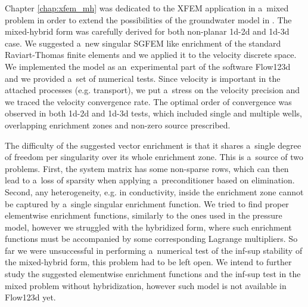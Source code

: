 \documentclass[bibliography=totocnumbered,dvipsnames,FM,Dis,EN]{tulthesis}
\begin{document}
Chapter \ref{chap:xfem_mh} was dedicated to the XFEM application in a~mixed problem
in order to extend the possibilities of the groundwater model in \cite{sistek_bddc_2015, flow123d}.
The mixed-hybrid form was carefully derived for both non-planar 1d-2d and 1d-3d case.
We suggested a~new singular SGFEM like enrichment of the standard Raviart-Thomas finite elements
and we applied it to the velocity discrete space.
We implemented the model as an~experimental part of the software Flow123d
and we provided a~set of numerical tests.
Since velocity is important in the attached processes (e.g. transport),
we put a~stress on the velocity precision and we traced the velocity convergence rate.
The optimal order of convergence was observed in both 1d-2d and 1d-3d tests,
which included single and multiple wells, overlapping enrichment zones and non-zero source prescribed.

The difficulty of the suggested vector enrichment is that it shares a~single degree of freedom per singularity
over its whole enrichment zone. This is a~source of two problems. First, the system matrix has some non-sparse rows,
which can then lead to a~loss of sparsity when applying a~preconditioner based on elimination.
Second, any heterogeneity, e.g. in conductivity, inside the enrichment zone cannot be captured by
a~single singular enrichment function.
We tried to find proper elementwise enrichment functions, similarly to the ones used in the pressure model,
however we struggled with the hybridized form, where such enrichment functions must be accompanied
by some corresponding Lagrange multipliers.
So far we were unsuccessful in performing a~numerical test of the inf-sup stability
of the mixed-hybrid form, this problem had to be left open.
We intend to further study the suggested elementwise enrichment functions and the inf-sup test in the mixed problem without hybridization,
however such model is not available in Flow123d yet.
\end{document}
